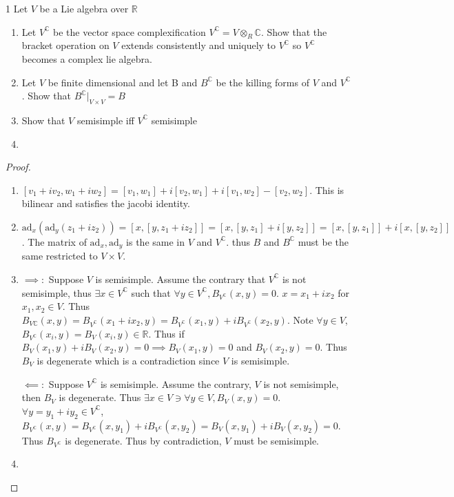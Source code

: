 \documentclass{article}
\newcommand{\C}{\mathbb{C}}
\newcommand{\R}{\mathbb{R}}
\newcommand{\ad}[1]{\text{ad}_{#1}}
\begin{document}
\begin{PROB}{1}\label{Problem 1.}
    Let $V$ be a Lie algebra over $\R$
    
    \begin{enumerate}
        \item Let $V^\C$ be the vector space complexification $V^\C = V \otimes_R \C$. Show that the bracket operation on $V$ extends consistently and uniquely to $V^\C$ so $V^\C$ becomes a complex lie algebra.  
        \item Let $V$ be finite dimensional and let B and $B^\C$ be the killing forms of $V$ and $V^\C$. Show that $B^\C|_{V \times V} = B$   
        \item Show that $V$ semisimple iff $V^\C$ semisimple
        \item       
    \end{enumerate}
    
\end{PROB}
\begin{proof}
    \begin{enumerate}
        \item $[v_1 + iv_2, w_1 + iw_2] = [v_1, w_1] +i[v_2, w_1] + i[v_1, w_2] - [v_2, w_2]$. This is bilinear and satisfies the jacobi identity. 

        \item $\ad{x}(\ad{y}(z_1 + iz_2)) = [x, [y, z_1 + iz_2]] = [x, [y, z_1] + i[y, z_2]] = [x, [y, z_1]] + i[x, [y, z_2]]$. The matrix of $\ad{x},\ad{y}$ is the same in $V$ and $V^\C$. thus $B$ and $B^\C$ must be the same restricted to $V \times V$. 
        
        \item $\implies:$ Suppose $V$ is semisimple. Assume the contrary that $V^\C$ is not semisimple, thus $\exists x \in V^\C$ such that $\forall y \in V^\C, B_{V^\C}(x, y) = 0$. $x = x_1 + i x_2$ for $x_1, x_2 \in V$. Thus $B_{V \C}(x, y) = B_{V^\C}(x_1 + ix_2, y) = B_{V^\C}(x_1, y) + iB_{V^\C}(x_2, y)$. Note $\forall y \in V$, $B_{V^\C}(x_i, y) = B_{V}(x_i, y) \in \R$. Thus if $B_{V}(x_1, y) + i B_{V}(x_2, y) = 0 \implies B_{V}(x_1, y) = 0$ and $B_{V}(x_2, y) = 0$. Thus $B_{V}$ is degenerate which is a contradiction since $V$ is semisimple. 
        
        $\impliedby:$ Suppose $V^\C$ is semisimple. Assume the contrary, $V$ is not semisimple, then $B_V$ is degenerate. Thus $\exists x \in V \ni \forall y \in V, B_V(x, y) = 0$. $\forall y = y_1 + i y_2 \in V^\C$, $B_{V^\C}(x, y) = B_{V^\C}(x, y_1) + iB_{V^\C}(x, y_2) = B_{V}(x, y_1) + iB_V(x, y_2) = 0$. Thus $B_{V^\C}$ is degenerate. Thus by contradiction, $V$ must be semisimple. 

        \item 
    \end{enumerate}


    
\end{proof}
\end{document}
